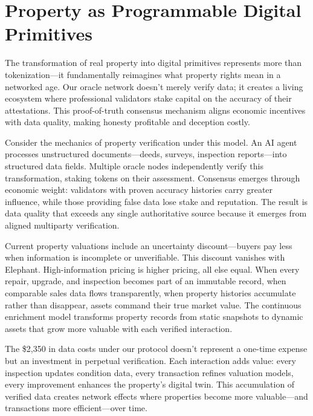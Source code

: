 \section{Property as Programmable Digital Primitives}

The transformation of real property into digital primitives represents more than tokenization—it fundamentally reimagines what property rights mean in a networked age. Our oracle network doesn't merely verify data; it creates a living ecosystem where professional validators stake capital on the accuracy of their attestations. This proof-of-truth consensus mechanism aligns economic incentives with data quality, making honesty profitable and deception costly.

Consider the mechanics of property verification under this model. An AI agent processes unstructured documents—deeds, surveys, inspection reports—into structured data fields. Multiple oracle nodes independently verify this transformation, staking tokens on their assessment. Consensus emerges through economic weight: validators with proven accuracy histories carry greater influence, while those providing false data lose stake and reputation. The result is data quality that exceeds any single authoritative source because it emerges from aligned multiparty verification.

Current property valuations include an uncertainty discount—buyers pay less when information is incomplete or unverifiable. This discount vanishes with Elephant. High-information pricing is higher pricing, all else equal. When every repair, upgrade, and inspection becomes part of an immutable record, when comparable sales data flows transparently, when property histories accumulate rather than disappear, assets command their true market value. The continuous enrichment model transforms property records from static snapshots to dynamic assets that grow more valuable with each verified interaction.

The \$2{,}350 in data costs under our protocol doesn't represent a one-time expense but an investment in perpetual verification. Each interaction adds value: every inspection updates condition data, every transaction refines valuation models, every improvement enhances the property's digital twin. This accumulation of verified data creates network effects where properties become more valuable—and transactions more efficient—over time.

